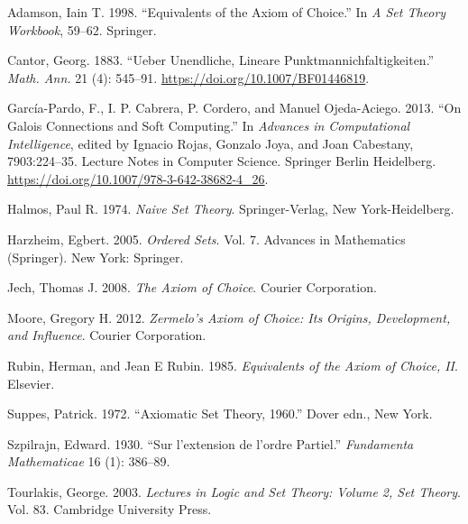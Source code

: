 \documentclass[
  letterpaper,
  10pt,
  reqno,
  twopage,
  openany]{book}
\newlength{\cslhangindent}
\newlength{\cslentryspacingunit} %
\newenvironment{CSLReferences}[2] %
 {%
  \setlength{\parindent}{0pt}
  \ifodd #1
  \let\oldpar\par
  \def\par{\hangindent=\cslhangindent\oldpar}
  \fi
  \setlength{\parskip}{#2\cslentryspacingunit}
 }%
 {}
\theoremstyle{plain}
\theoremstyle{definition}
\theoremstyle{definition}
\theoremstyle{definition}
\theoremstyle{plain}
\theoremstyle{plain}
\theoremstyle{remark}
\begin{document}

\hypertarget{refs}{}
\begin{CSLReferences}{1}{0}
\leavevmode{}%
Adamson, Iain T. 1998. {``Equivalents of the Axiom of Choice.''} In
\emph{A Set Theory Workbook}, 59--62. Springer.

\leavevmode{}%
Cantor, Georg. 1883. {``Ueber Unendliche, Lineare
{P}unktmannichfaltigkeiten.''} \emph{Math. Ann.} 21 (4): 545--91.
\url{https://doi.org/10.1007/BF01446819}.

\leavevmode{}%
García-Pardo, F., I. P. Cabrera, P. Cordero, and Manuel Ojeda-Aciego.
2013. {``On Galois Connections and Soft Computing.''} In \emph{Advances
in Computational Intelligence}, edited by Ignacio Rojas, Gonzalo Joya,
and Joan Cabestany, 7903:224--35. Lecture Notes in Computer Science.
Springer Berlin Heidelberg.
\url{https://doi.org/10.1007/978-3-642-38682-4_26}.

\leavevmode{}%
Halmos, Paul R. 1974. \emph{Naive Set Theory}. Springer-Verlag, New
York-Heidelberg.

\leavevmode{}%
Harzheim, Egbert. 2005. \emph{Ordered Sets}. Vol. 7. Advances in
Mathematics (Springer). New York: Springer.

\leavevmode{}%
Jech, Thomas J. 2008. \emph{The Axiom of Choice}. Courier Corporation.

\leavevmode{}%
Moore, Gregory H. 2012. \emph{Zermelo's Axiom of Choice: Its Origins,
Development, and Influence}. Courier Corporation.

\leavevmode{}%
Rubin, Herman, and Jean E Rubin. 1985. \emph{Equivalents of the Axiom of
Choice, II}. Elsevier.

\leavevmode{}%
Suppes, Patrick. 1972. {``Axiomatic Set Theory, 1960.''} Dover edn., New
York.

\leavevmode{}%
Szpilrajn, Edward. 1930. {``Sur l'extension de l'ordre Partiel.''}
\emph{Fundamenta Mathematicae} 16 (1): 386--89.

\leavevmode{}%
Tourlakis, George. 2003. \emph{Lectures in Logic and Set Theory: Volume
2, Set Theory}. Vol. 83. Cambridge University Press.

\end{CSLReferences}


\backmatter


\printindex
\end{document}
